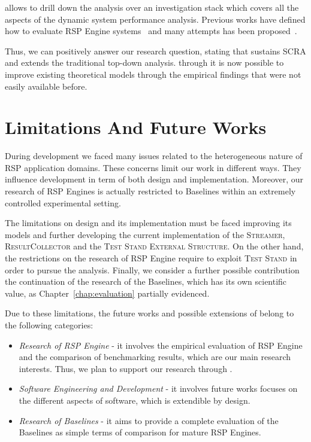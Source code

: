 \noindent \name allows to drill down the analysis over an investigation stack which covers all the aspects of the dynamic system performance analysis. Previous works have defined how to evaluate RSP Engine systems~\cite{DBLP:conf/esws/ScharrenbachUMVB13} and many attempts has been proposed~\cite{Zhang2012, LePhuoc2012c, DBLP:conf/semweb/DellAglioCBCV13}. 

Thus, we can positively answer our research question, stating that \name sustains SCRA and extends the traditional top-down analysis. through it is now possible to improve existing theoretical models through the empirical findings that were not easily available before.

\section{Limitations And Future Works}\label{sec:research-fw-conclusion}

During \name development we faced many issues related to the heterogeneous nature of RSP application domains. These concerns limit our work in different ways. They influence \name development in term of both design and implementation. Moreover, our research of RSP Engines  is actually restricted to \name Baselines within an extremely controlled experimental setting.

The limitations on \name design and its implementation must be faced improving its models and further developing the current implementation of the \textsc{Streamer}, \textsc{ResultCollector} and the \textsc{Test Stand External Structure}. On the other hand, the restrictions on the research of RSP Engine require to exploit \name \textsc{Test Stand} in order to pursue the analysis. Finally, we consider a further possible contribution the continuation of the research of the Baselines, which has its own scientific value, as Chapter~\ref{chap:evaluation} partially evidenced.

Due to these limitations, the future works and possible extensions of \name belong to the following categories:
\begin{itemize}
\item \textit{Research of RSP Engine} - it involves the empirical evaluation of RSP Engine and the comparison of benchmarking results, which are our main research interests. Thus, we plan to support our research through \namens.
\item \textit{Software Engineering and Development} - it involves future works focuses on the different aspects of \name software, which is extendible by design.
\item \textit{Research of Baselines} - it aims to provide a complete evaluation of the Baselines as simple terms of comparison for mature RSP Engines.
\end{itemize}


